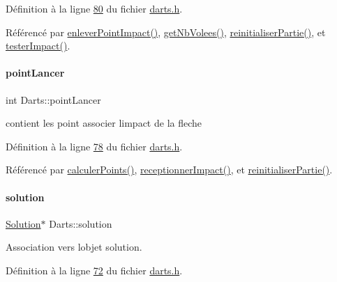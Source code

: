 Définition à la ligne \hyperlink{darts_8h_source_l00080}{80} du fichier \hyperlink{darts_8h_source}{darts.\+h}.



Référencé par \hyperlink{darts_8cpp_source_l00274}{enlever\+Point\+Impact()}, \hyperlink{darts_8cpp_source_l00088}{get\+Nb\+Volees()}, \hyperlink{darts_8cpp_source_l00184}{reinitialiser\+Partie()}, et \hyperlink{darts_8cpp_source_l00246}{tester\+Impact()}.

\mbox{\label{class_darts_a7ed0e6c9c07930603f85c2bac5b9d78b}} 
\paragraph{\texorpdfstring{point\+Lancer}{pointLancer}}
{\footnotesize\ttfamily int Darts\+::point\+Lancer\hspace{0.3cm}{\ttfamily [private]}}



contient les point associer l\textquotesingle{}impact de la fleche 



Définition à la ligne \hyperlink{darts_8h_source_l00078}{78} du fichier \hyperlink{darts_8h_source}{darts.\+h}.



Référencé par \hyperlink{darts_8cpp_source_l00478}{calculer\+Points()}, \hyperlink{darts_8cpp_source_l00223}{receptionner\+Impact()}, et \hyperlink{darts_8cpp_source_l00184}{reinitialiser\+Partie()}.

\mbox{\label{class_darts_a40733010dc6ae4ce93140804b4d191ea}} 
\paragraph{\texorpdfstring{solution}{solution}}
{\footnotesize\ttfamily \hyperlink{class_solution}{Solution}$\ast$ Darts\+::solution\hspace{0.3cm}{\ttfamily [private]}}



Association vers l\textquotesingle{}objet solution. 



Définition à la ligne \hyperlink{darts_8h_source_l00072}{72} du fichier \hyperlink{darts_8h_source}{darts.\+h}.



